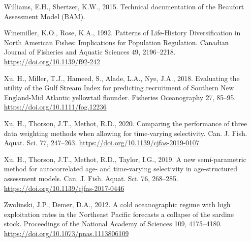 \documentclass[]{article}
\begin{document}
\leavevmode\hypertarget{ref-williams2015BAM}{}%
Williams, E.H., Shertzer, K.W., 2015. Technical documentation of the
Beaufort Assessment Model (BAM).

\leavevmode\hypertarget{ref-winemiller1992Patterns}{}%
Winemiller, K.O., Rose, K.A., 1992. Patterns of Life-History
Diversification in North American Fishes: Implications for Population
Regulation. Canadian Journal of Fisheries and Aquatic Sciences 49,
2196--2218. \url{https://doi.org/10.1139/f92-242}

\leavevmode\hypertarget{ref-xu2018Evaluating}{}%
Xu, H., Miller, T.J., Hameed, S., Alade, L.A., Nye, J.A., 2018.
Evaluating the utility of the Gulf Stream Index for predicting
recruitment of Southern New England-Mid Atlantic yellowtail flounder.
Fisheries Oceanography 27, 85--95.
\url{https://doi.org/10.1111/fog.12236}

\leavevmode\hypertarget{ref-xu2020Comparing}{}%
Xu, H., Thorson, J.T., Methot, R.D., 2020. Comparing the performance of
three data weighting methods when allowing for time-varying selectivity.
Can. J. Fish. Aquat. Sci. 77, 247--263.
\url{https://doi.org/10.1139/cjfas-2019-0107}

\leavevmode\hypertarget{ref-xu2019New}{}%
Xu, H., Thorson, J.T., Methot, R.D., Taylor, I.G., 2019. A new
semi-parametric method for autocorrelated age- and time-varying
selectivity in age-structured assessment models. Can. J. Fish. Aquat.
Sci. 76, 268--285. \url{https://doi.org/10.1139/cjfas-2017-0446}

\leavevmode\hypertarget{ref-zwolinski2012Cold}{}%
Zwolinski, J.P., Demer, D.A., 2012. A cold oceanographic regime with
high exploitation rates in the Northeast Pacific forecasts a collapse of
the sardine stock. Proceedings of the National Academy of Sciences 109,
4175--4180. \url{https://doi.org/10.1073/pnas.1113806109}

\pagebreak
\end{document}
